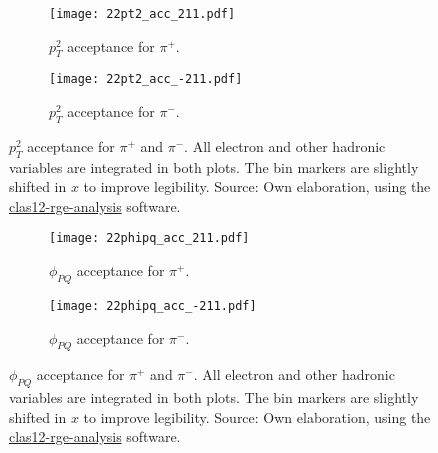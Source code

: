     \begin{figure}
        \centering
        \begin{subfigure}[b]{0.49\textwidth}
            \centering
            \texttt{[image: 22pt2\_acc\_211.pdf]}
            \caption{$p_T^2$ acceptance for $\pi^+$.}
            \label{fig::14.22::pt2_acc_211}
        \end{subfigure}
        \hfill
        \begin{subfigure}[b]{0.49\textwidth}
            \centering
            \texttt{[image: 22pt2\_acc\_-211.pdf]}
            \caption{$p_T^2$ acceptance for $\pi^-$.}
            \label{fig::14.22::pt2_acc_-211}
        \end{subfigure}
        \caption[$p_T^2$ acceptance.]{$p_T^2$ acceptance for $\pi^+$ and $\pi^-$.
        All electron and other hadronic variables are integrated in both plots.
        The bin markers are slightly shifted in $x$ to improve legibility.
        Source: Own elaboration, using the \href{https://github.com/bleaktwig/clas12-rge-analysis}{clas12-rge-analysis} software.}
        \label{fig::14.22::pt2_acc}
    \end{figure}

    \begin{figure}
        \centering
        \begin{subfigure}[b]{0.49\textwidth}
            \centering
            \texttt{[image: 22phipq\_acc\_211.pdf]}
            \caption{$\phi_{PQ}$ acceptance for $\pi^+$.}
            \label{fig::14.22::phipq_acc_211}
        \end{subfigure}
        \hfill
        \begin{subfigure}[b]{0.49\textwidth}
            \centering
            \texttt{[image: 22phipq\_acc\_-211.pdf]}
            \caption{$\phi_{PQ}$ acceptance for $\pi^-$.}
            \label{fig::14.22::phipq_acc_-211}
        \end{subfigure}
        \caption[$\phi_{PQ}$ acceptance.]{$\phi_{PQ}$ acceptance for $\pi^+$ and $\pi^-$.
        All electron and other hadronic variables are integrated in both plots.
        The bin markers are slightly shifted in $x$ to improve legibility.
        Source: Own elaboration, using the \href{https://github.com/bleaktwig/clas12-rge-analysis}{clas12-rge-analysis} software.}
        \label{fig::14.22::phipq_acc}
    \end{figure}
